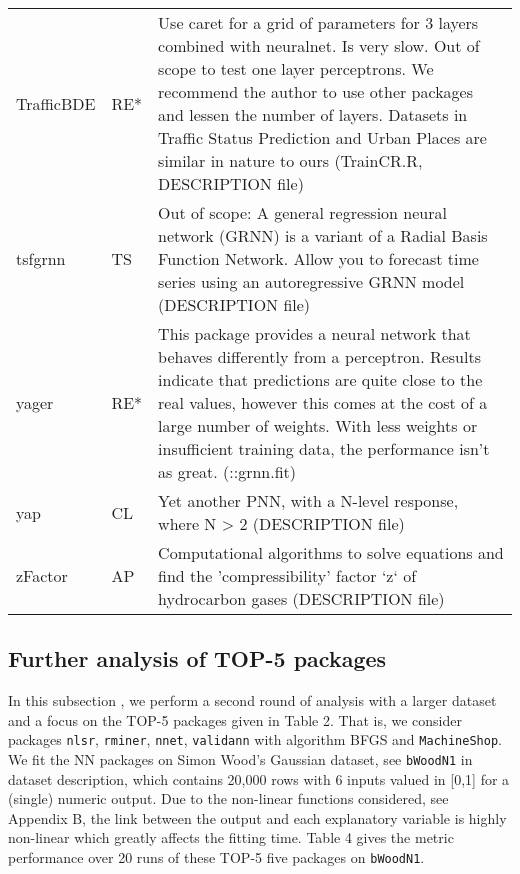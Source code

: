 \begin{Schunk}
\begin{longtable}[t]{ll>{\raggedright\arraybackslash}p{10cm}}
TrafficBDE & RE* & Use caret for a grid of parameters for 3 layers combined with neuralnet. Is very slow. Out of scope to test one layer perceptrons. We recommend the author to use other packages and lessen the number of layers. Datasets in Traffic Status Prediction and Urban Places are similar in nature to ours (TrainCR.R, DESCRIPTION file)\\
tsfgrnn & TS & Out of scope: A general regression neural network (GRNN) is a variant of a Radial Basis Function Network. Allow you to forecast time series using an autoregressive GRNN model (DESCRIPTION file)\\
\addlinespace
yager & RE* & This package provides a neural network that behaves differently from a perceptron. Results indicate that predictions are quite close to the real values, however this comes at the cost of a large number of weights. With less weights or insufficient training data, the performance isn't as great. (::grnn.fit)\\
yap & CL & Yet another PNN, with a N-level response, where N > 2 (DESCRIPTION file)\\
zFactor & AP & Computational algorithms to solve equations and find the 'compressibility' factor `z` of hydrocarbon gases (DESCRIPTION file)\\*
\end{longtable}
\endgroup{}

\end{Schunk}

\hypertarget{further-analysis-of-top-5-packages}{%
\subsection{Further analysis of TOP-5
packages}\label{further-analysis-of-top-5-packages}}

In this subsection , we perform a second round of analysis with a larger
dataset and a focus on the TOP-5 packages given in Table 2. That is, we
consider packages \texttt{nlsr}, \texttt{rminer}, \texttt{nnet},
\texttt{validann} with algorithm BFGS and \texttt{MachineShop}. We fit
the NN packages on Simon Wood's Gaussian dataset, see \texttt{bWoodN1}
in dataset description, which contains 20,000 rows with 6 inputs valued
in {[}0,1{]} for a (single) numeric output. Due to the non-linear
functions considered, see Appendix B, the link between the output and
each explanatory variable is highly non-linear which greatly affects the
fitting time. Table 4 gives the metric performance over 20 runs of these
TOP-5 five packages on \texttt{bWoodN1}.

